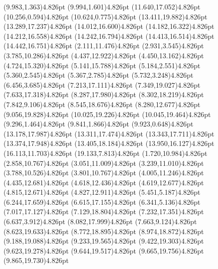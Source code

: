 \documentclass[10pt]{article}
\begin{document}
{{\qdisk(9.983,1.363){4.826pt}%
\qdisk(9.994,1.601){4.826pt}%
\qdisk(11.640,17.052){4.826pt}%
\qdisk(10.256,0.594){4.826pt}%
\qdisk(10.624,0.775){4.826pt}%
\qdisk(13.411,19.882){4.826pt}%
\qdisk(13.289,17.237){4.826pt}%
\qdisk(14.012,16.600){4.826pt}%
\qdisk(14.182,16.322){4.826pt}%
\qdisk(14.212,16.558){4.826pt}%
\qdisk(14.242,16.794){4.826pt}%
\qdisk(14.413,16.514){4.826pt}%
\qdisk(14.442,16.751){4.826pt}%
\dummycolor
\qdisk(2.111,11.476){4.826pt}%
\qdisk(2.931,3.545){4.826pt}%
\qdisk(3.785,10.286){4.826pt}%
\qdisk(4.437,12.922){4.826pt}%
\qdisk(4.450,13.162){4.826pt}%
\qdisk(4.724,15.320){4.826pt}%
\qdisk(5.141,15.788){4.826pt}%
\qdisk(5.184,2.551){4.826pt}%
\qdisk(5.360,2.545){4.826pt}%
\qdisk(5.367,2.785){4.826pt}%
\qdisk(5.732,3.248){4.826pt}%
\qdisk(6.456,3.685){4.826pt}%
\qdisk(7.213,17.111){4.826pt}%
\qdisk(7.349,19.027){4.826pt}%
\qdisk(7.633,17.318){4.826pt}%
\qdisk(8.287,17.980){4.826pt}%
\qdisk(8.302,18.219){4.826pt}%
\qdisk(7.842,9.106){4.826pt}%
\qdisk(8.545,18.676){4.826pt}%
\qdisk(8.280,12.677){4.826pt}%
\qdisk(9.056,19.828){4.826pt}%
\qdisk(10.025,19.226){4.826pt}%
\qdisk(10.045,19.464){4.826pt}%
\qdisk(9.296,1.464){4.826pt}%
\qdisk(9.841,1.866){4.826pt}%
\qdisk(9.923,0.648){4.826pt}%
\qdisk(13.178,17.987){4.826pt}%
\qdisk(13.311,17.474){4.826pt}%
\qdisk(13.343,17.711){4.826pt}%
\qdisk(13.374,17.948){4.826pt}%
\qdisk(13.405,18.184){4.826pt}%
\qdisk(13.950,16.127){4.826pt}%
\qdisk(16.113,11.703){4.826pt}%
\qdisk(19.133,7.813){4.826pt}%
\dummycolor
\qdisk(1.720,10.984){4.826pt}%
\qdisk(2.858,10.767){4.826pt}%
\qdisk(3.051,11.009){4.826pt}%
\qdisk(3.239,11.010){4.826pt}%
\qdisk(3.788,10.526){4.826pt}%
\qdisk(3.801,10.767){4.826pt}%
\qdisk(4.005,11.246){4.826pt}%
\qdisk(4.435,12.681){4.826pt}%
\qdisk(4.618,12.436){4.826pt}%
\qdisk(4.619,12.677){4.826pt}%
\qdisk(4.815,12.671){4.826pt}%
\qdisk(4.827,12.911){4.826pt}%
\qdisk(5.451,5.187){4.826pt}%
\qdisk(6.244,17.659){4.826pt}%
\qdisk(6.615,17.155){4.826pt}%
\qdisk(6.341,5.136){4.826pt}%
\qdisk(7.017,17.127){4.826pt}%
\qdisk(7.129,18.804){4.826pt}%
\qdisk(7.232,17.351){4.826pt}%
\qdisk(6.637,3.912){4.826pt}%
\qdisk(8.082,17.999){4.826pt}%
\qdisk(7.663,9.124){4.826pt}%
\qdisk(8.623,19.633){4.826pt}%
\qdisk(8.772,18.895){4.826pt}%
\qdisk(8.974,18.872){4.826pt}%
\qdisk(9.188,19.088){4.826pt}%
\qdisk(9.233,19.565){4.826pt}%
\qdisk(9.422,19.303){4.826pt}%
\qdisk(9.623,19.278){4.826pt}%
\qdisk(9.644,19.517){4.826pt}%
\qdisk(9.665,19.756){4.826pt}%
\qdisk(9.865,19.730){4.826pt}%
}}
\end{document}
